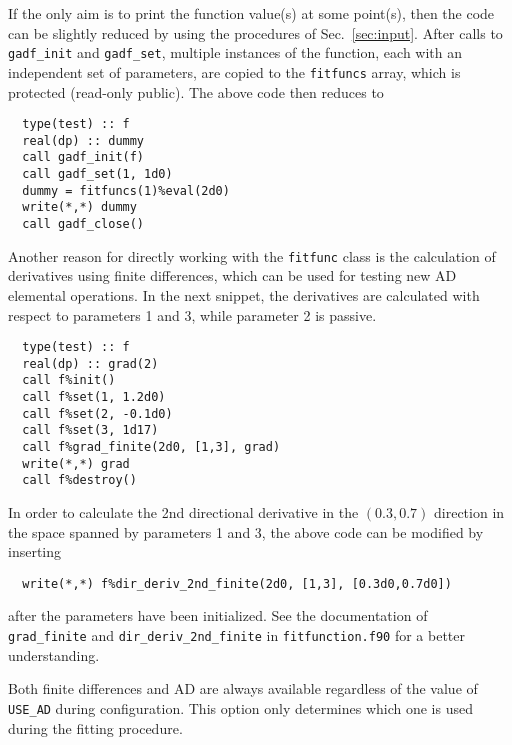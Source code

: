 \documentclass{article}
\begin{document}
If the only aim is to print the function value(s) at some point(s), then the code can be slightly reduced by using the procedures of Sec.~\ref{sec:input}. After calls to \verb+gadf_init+ and \verb+gadf_set+, multiple instances of the function, each with an independent set of parameters, are copied to the \verb+fitfuncs+ array, which is protected (read-only public). The above code then reduces to
\begin{verbatim}
  type(test) :: f
  real(dp) :: dummy
  call gadf_init(f)
  call gadf_set(1, 1d0)
  dummy = fitfuncs(1)%eval(2d0)
  write(*,*) dummy
  call gadf_close()
\end{verbatim}
Another reason for directly working with the \verb+fitfunc+ class is the calculation of derivatives using finite differences, which can be used for testing new AD elemental operations. In the next snippet, the derivatives are calculated with respect to parameters 1 and 3, while parameter 2 is passive.
\begin{verbatim}
  type(test) :: f
  real(dp) :: grad(2)
  call f%init()
  call f%set(1, 1.2d0)
  call f%set(2, -0.1d0)
  call f%set(3, 1d17)
  call f%grad_finite(2d0, [1,3], grad)
  write(*,*) grad
  call f%destroy()
\end{verbatim}
In order to calculate the 2nd directional derivative in the $(0.3,0.7)$ direction in the space spanned by parameters 1 and 3, the above code can be modified by inserting
\begin{verbatim}
  write(*,*) f%dir_deriv_2nd_finite(2d0, [1,3], [0.3d0,0.7d0])
\end{verbatim}
after the parameters have been initialized. See the documentation of \\
\verb+grad_finite+ and \verb+dir_deriv_2nd_finite+ in \verb+fitfunction.f90+ for a better understanding.

Both finite differences and AD are always available regardless of the value of \verb+USE_AD+ during configuration. This option only determines which one is used during the fitting procedure.
\end{document}

